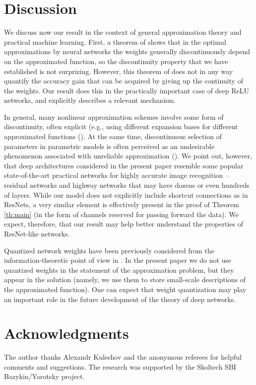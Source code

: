 \documentclass[final, 12pt]{colt2018}
\begin{document}
\section{Discussion}\label{sec:discus}

We discuss now our result in the context of general approximation theory and practical machine learning. First, a theorem of \cite{kainen1999approximation} shows that in the optimal approximations by neural networks the weights generally discontinuously depend on the approximated function, so the discontinuity property that we have established is not surprizing. However, this theorem of \cite{kainen1999approximation} does not in any way quantify the accuracy gain that can be acquired by giving up the continuity of the weights. Our result does this in the practically important case of deep ReLU networks, and explicitly describes a relevant mechanism.  


In general, many nonlinear approximation schemes involve some form of discontinuity, often explicit (e.g., using different expansion bases for different approximated functions (\cite{devore1998nonlinear}). At the same time, discontinuous selection of parameters in parametric models is often perceived as an undesirable  phenomenon associated with unreliable approximation (\cite{devore1989optimal,devore1998nonlinear}). We point out, however, that deep  architectures considered in the present paper resemble some popular state-of-the-art practical networks for highly accurate image recognition -- residual networks \citep{he2016deep} and highway networks \citep{srivastava2015highway} that may have dozens or even hundreds of layers. While our model does not explicitly include shortcut connections as in ResNets, a very similar element is effectively present in the proof of Theorem \ref{th:main} (in the form of channels reserved for passing forward the data). We expect, therefore, that our result may help better understand the properties of ResNet-like networks. 

Quantized network weights have been previously considered from the information-theoretic point of view in \cite{bolcskei2017memory,petersen2017optimal}. In the present paper we do not use quantized weights in the statement of the approximation problem, but they appear in the solution (namely, we use them to store small-scale descriptions of the approximated function). One can expect that weight quantization may play an important role in the future development of the theory of deep networks. 


\section*{Acknowledgments}
The author thanks Alexandr Kuleshov and the anonymous referees for helpful comments and suggestions. The research was supported by the Skoltech SBI Bazykin/Yarotsky project.


\end{document}
